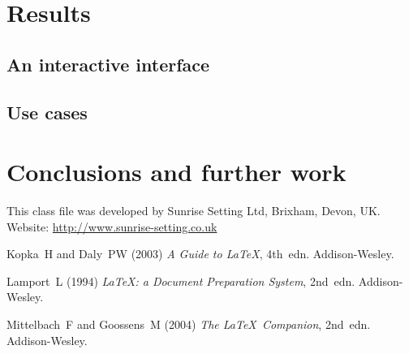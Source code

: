 \documentclass[Afour,sageh,times]{sagej}
\begin{document}
\section{Results}
\subsection{An interactive interface}
\subsection{Use cases}

\section{Conclusions and further work}
\begin{acks}
This class file was developed by Sunrise Setting Ltd,
Brixham, Devon, UK.\\
Website: \url{http://www.sunrise-setting.co.uk}
\end{acks}

\begin{thebibliography}{99}
Kopka~H and Daly~PW (2003) \textit{A Guide to \LaTeX}, 4th~edn.
Addison-Wesley.

Lamport~L (1994) \textit{\LaTeX: a Document Preparation System},
2nd~edn. Addison-Wesley.

Mittelbach~F and Goossens~M (2004) \textit{The \LaTeX\ Companion},
2nd~edn. Addison-Wesley.

\end{thebibliography}
\end{document}
